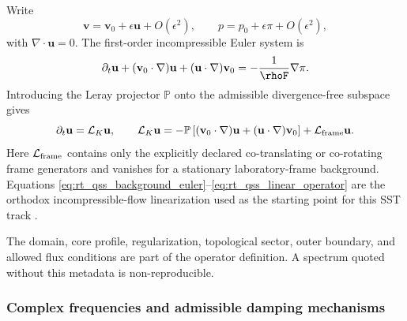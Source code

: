         Write
        \begin{equation}
            \mathbf v
            =
            \mathbf v_0+\epsilon\mathbf u+O(\epsilon^2),
            \qquad
            p
            =
            p_0+\epsilon\pi+O(\epsilon^2),
        \end{equation}
        with \(\nabla\cdot\mathbf u=0\).  The first-order incompressible Euler system is
        \begin{equation}
            \partial_t\mathbf u
            +
            (\mathbf v_0\cdot\nabla)\mathbf u
            +
            (\mathbf u\cdot\nabla)\mathbf v_0
            =
            -\frac{1}{\rhoF}\nabla\pi.
            \label{eq:rt_qss_linearized_euler}
        \end{equation}
        Introducing the Leray projector \(\mathbb P\) onto the admissible
        divergence-free subspace gives
        \begin{equation}
            \partial_t\mathbf u
            =
            \mathcal L_K\mathbf u,
            \qquad
            \mathcal L_K\mathbf u
            =
            -\mathbb P
            \left[
                (\mathbf v_0\cdot\nabla)\mathbf u
                +
                (\mathbf u\cdot\nabla)\mathbf v_0
            \right]
            +
            \mathcal L_{\rm frame}\mathbf u.
            \label{eq:rt_qss_linear_operator}
        \end{equation}
        Here \(\mathcal L_{\rm frame}\) contains only the explicitly declared
        co-translating or co-rotating frame generators and vanishes for a stationary
        laboratory-frame background.  Equations
        \eqref{eq:rt_qss_background_euler}--\eqref{eq:rt_qss_linear_operator} are the
        orthodox incompressible-flow linearization used as the starting point for this
        SST track \cite{MajdaBertozzi2002}.

        The domain, core profile, regularization, topological sector, outer boundary,
        and allowed flux conditions are part of the operator definition.  A spectrum
        quoted without this metadata is non-reproducible.

    \subsubsection*{Complex frequencies and admissible damping mechanisms}

